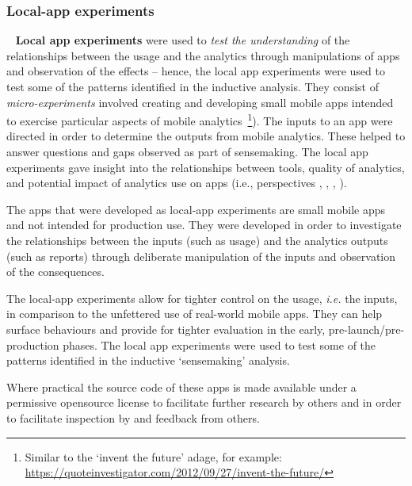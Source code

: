 \subsubsection{Local-app experiments}~\label{local-app-experiments-research-method} 
\textbf{Local app experiments} were used to \textit{test the understanding} of the relationships between the usage and the analytics through manipulations of apps and observation of the effects -- hence, the local app experiments were used to test some of the patterns identified in the inductive analysis. They consist of \textit{micro-experiments} involved creating and developing small mobile apps intended to exercise particular aspects of mobile analytics~\footnote{Similar to the `invent the future' adage, for example: \url{https://quoteinvestigator.com/2012/09/27/invent-the-future/}}). The inputs to an app were directed in order to determine the outputs from mobile analytics. These helped to answer questions and gaps observed as part of sensemaking.  The local app experiments gave insight into the relationships between tools, quality of analytics, and potential impact of analytics use on apps (i.e., perspectives \uartefacts, \utools, \iartefacts, \itools). 

The apps that were developed as local-app experiments are small mobile apps and not intended for production use. They were developed in order to investigate the relationships between the inputs (such as usage) and the analytics outputs (such as reports) through deliberate manipulation of the inputs and observation of the consequences.  

The local-app experiments allow for tighter control on the usage, \textit{i.e.} the inputs, in comparison to the unfettered use of real-world mobile apps. They can help surface behaviours and provide for tighter evaluation in the early, pre-launch/pre-production phases. %
The local app experiments were used to test some of the patterns identified in the inductive `sensemaking' analysis.

Where practical the source code of these apps is made available under a permissive opensource license to facilitate further research by others and in order to facilitate inspection by and feedback from others.




